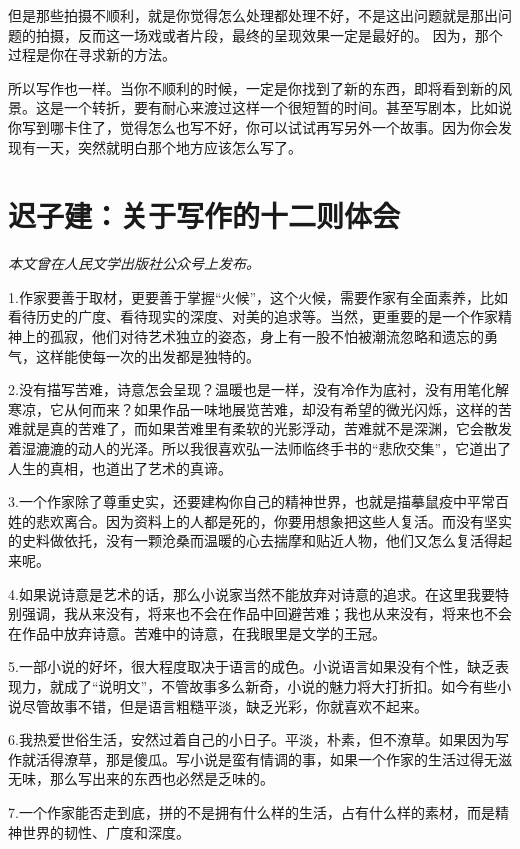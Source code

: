 \documentclass[12pt,a5paper]{ctexbook}
\begin{document}
‍‍但是那些拍摄不顺利，就是你觉得怎么处理都处理不好，不是这出问题就是那出问题的拍摄，‍‍反而这一场戏或者片段，最终的呈现效果一定是最好的。
因为，那个过程是你在寻求新的方法。

‍‍所以写作也一样。当你不顺利的时候，一定是你找到了新的东西，即将看到新的风景。这是‍‍一个转折，要有耐心来渡过这样一个很短暂的时间‍。甚至写剧本，‍‍比如说你写到哪卡住了，觉得怎么也写不好，你可以试试再写另外一个故事。因为你会发现有一天，突然就明白那个地方应该怎么写了。


\newpage

\section{迟子建：关于写作的十二则体会}

\emph{本文曾在人民文学出版社公众号上发布。}
\vspace{2em}

1.作家要善于取材，更要善于掌握“火候”，这个火候，需要作家有全面素养，比如看待历史的广度、看待现实的深度、对美的追求等。当然，更重要的是一个作家精神上的孤寂，他们对待艺术独立的姿态，身上有一股不怕被潮流忽略和遗忘的勇气，这样能使每一次的出发都是独特的。

2.没有描写苦难，诗意怎会呈现？温暖也是一样，没有冷作为底衬，没有用笔化解寒凉，它从何而来？如果作品一味地展览苦难，却没有希望的微光闪烁，这样的苦难就是真的苦难了，而如果苦难里有柔软的光影浮动，苦难就不是深渊，它会散发着湿漉漉的动人的光泽。所以我很喜欢弘一法师临终手书的“悲欣交集”，它道出了人生的真相，也道出了艺术的真谛。

3.一个作家除了尊重史实，还要建构你自己的精神世界，也就是描摹鼠疫中平常百姓的悲欢离合。因为资料上的人都是死的，你要用想象把这些人复活。而没有坚实的史料做依托，没有一颗沧桑而温暖的心去揣摩和贴近人物，他们又怎么复活得起来呢。

4.如果说诗意是艺术的话，那么小说家当然不能放弃对诗意的追求。在这里我要特别强调，我从来没有，将来也不会在作品中回避苦难；我也从来没有，将来也不会在作品中放弃诗意。苦难中的诗意，在我眼里是文学的王冠。

5.一部小说的好坏，很大程度取决于语言的成色。小说语言如果没有个性，缺乏表现力，就成了“说明文”，不管故事多么新奇，小说的魅力将大打折扣。如今有些小说尽管故事不错，但是语言粗糙平淡，缺乏光彩，你就喜欢不起来。

6.我热爱世俗生活，安然过着自己的小日子。平淡，朴素，但不潦草。如果因为写作就活得潦草，那是傻瓜。写小说是蛮有情调的事，如果一个作家的生活过得无滋无味，那么写出来的东西也必然是乏味的。

7.一个作家能否走到底，拼的不是拥有什么样的生活，占有什么样的素材，而是精神世界的韧性、广度和深度。
\end{document}
